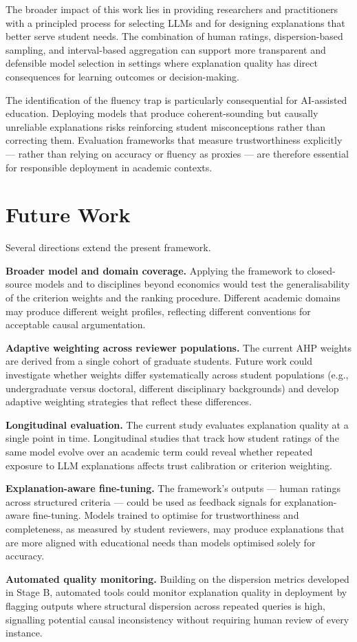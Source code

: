 The broader impact of this work lies in providing researchers and practitioners with
a principled process for selecting LLMs and for designing explanations that better
serve student needs. The combination of human ratings, dispersion-based sampling,
and interval-based aggregation can support more transparent and defensible model
selection in settings where explanation quality has direct consequences for learning
outcomes or decision-making.

The identification of the fluency trap is particularly consequential for AI-assisted
education. Deploying models that produce coherent-sounding but causally unreliable
explanations risks reinforcing student misconceptions rather than correcting them.
Evaluation frameworks that measure trustworthiness explicitly — rather than relying
on accuracy or fluency as proxies — are therefore essential for responsible
deployment in academic contexts.

\section{Future Work}
\label{sec:conc-future}

Several directions extend the present framework.

\textbf{Broader model and domain coverage.} Applying the framework to closed-source
models and to disciplines beyond economics would test the generalisability of the
criterion weights and the ranking procedure. Different academic domains may produce
different weight profiles, reflecting different conventions for acceptable causal
argumentation.

\textbf{Adaptive weighting across reviewer populations.} The current AHP weights are
derived from a single cohort of graduate students. Future work could investigate
whether weights differ systematically across student populations (e.g., undergraduate
versus doctoral, different disciplinary backgrounds) and develop adaptive weighting
strategies that reflect these differences.

\textbf{Longitudinal evaluation.} The current study evaluates explanation quality at
a single point in time. Longitudinal studies that track how student ratings of the
same model evolve over an academic term could reveal whether repeated exposure to
LLM explanations affects trust calibration or criterion weighting.

\textbf{Explanation-aware fine-tuning.} The framework's outputs — human ratings
across structured criteria — could be used as feedback signals for explanation-aware
fine-tuning. Models trained to optimise for trustworthiness and completeness, as
measured by student reviewers, may produce explanations that are more aligned with
educational needs than models optimised solely for accuracy.

\textbf{Automated quality monitoring.} Building on the dispersion metrics developed
in Stage B, automated tools could monitor explanation quality in deployment by
flagging outputs where structural dispersion across repeated queries is high,
signalling potential causal inconsistency without requiring human review of every
instance.
